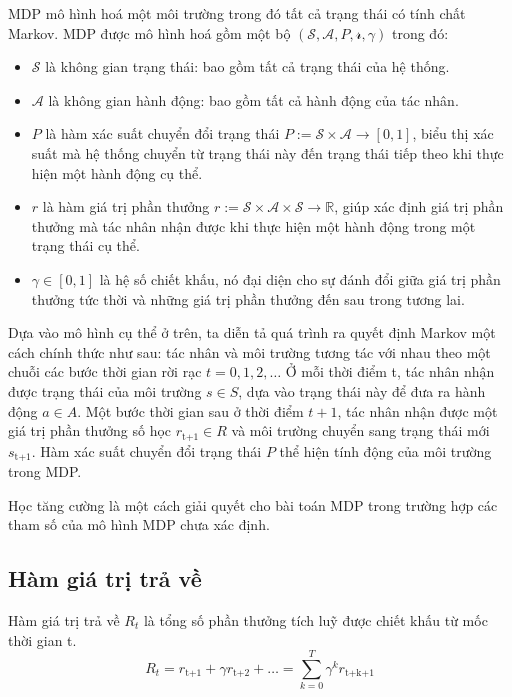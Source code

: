 \documentclass{uetgraduation}
\begin{document}
MDP mô hình hoá một môi trường trong đó tất cả trạng thái có tính chất Markov. MDP được mô hình hoá gồm một bộ $(\mathcal{S}, \mathcal{A}, P, \mathcal{r}, \gamma)$ trong đó:
\begin{itemize}
    \item $\mathcal{S}$ là không gian trạng thái: bao gồm tất cả trạng thái của hệ thống.
    \item $\mathcal{A}$ là không gian hành động: bao gồm tất cả hành động của tác nhân.
    \item $P$ là hàm xác suất chuyển đổi trạng thái $P := \mathcal{S} \times \mathcal{A} \to [0, 1] $, biểu thị xác suất mà hệ thống chuyển từ trạng thái này đến trạng thái tiếp theo khi thực hiện
    một hành động cụ thể.
    \item $r$ là hàm giá trị phần thưởng $r := \mathcal{S} \times \mathcal{A} \times \mathcal{S} \to \mathbb{R}$, giúp xác định giá trị phần thưởng mà tác nhân nhận được khi thực hiện một hành động
    trong một trạng thái cụ thể.
    \item $\gamma \in [0, 1]$ là hệ số chiết khấu, nó đại diện cho sự đánh đổi giữa giá trị phần thưởng tức thời và những giá trị phần thưởng đến sau trong tương lai.
\end{itemize}

Dựa vào mô hình cụ thể ở trên, ta diễn tả quá trình ra quyết định Markov một cách chính thức như sau: tác nhân và môi trường tương tác với nhau theo một chuỗi các bước thời gian rời rạc
$t = 0, 1, 2,\dots$ Ở mỗi thời điểm t, tác nhân nhận được trạng thái của môi trường $s \in S$, dựa vào trạng thái này để đưa ra hành động $a \in A$. Một bước thời gian sau ở thời điểm $t+1$,
tác nhân nhận được một giá trị phần thưởng số học $r_\text{t+1} \in R$ và môi trường chuyển sang trạng thái mới $s_\text{t+1}$. Hàm xác suất chuyển đổi trạng thái $P$ thể hiện tính động của
môi trường trong MDP.

Học tăng cường là một cách giải quyết cho bài toán MDP trong trường hợp các tham số của mô hình MDP chưa xác định.

\subsection{Hàm giá trị trả về}
Hàm giá trị trả về $R_t$ là tổng số phần thưởng tích luỹ được chiết khấu từ mốc thời gian t.
\begin{equation}
    R_t = r_\text{t+1} + \gamma r_\text{t+2} + \dots = \sum_{k=0}^{T} \gamma^k r_\text{t+k+1}
\end{equation}
\end{document}
